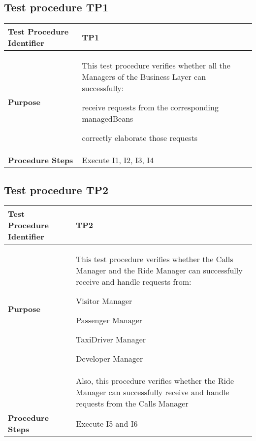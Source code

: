 \subsection{Test procedure TP1}

\begin{table}[!htbp]
\begin{center}
\begin{tabular}[t]{p{}|p{}}

\hline
\textbf{Test Procedure Identifier} & TP1 \\
\hline
\textbf{Purpose} & This test procedure verifies whether all the Managers of the Business Layer can successfully:
\begin{itemize*}
	\item receive requests from the corresponding managedBeans
	\item correctly elaborate those requests
\end{itemize*} \\
\hline
\textbf{Procedure Steps} & Execute I1, I2, I3, I4 \\
\hline

\end{tabular}
\end{center}
\end{table}


\subsection{Test procedure TP2}

\begin{table}[!htbp]
\begin{center}
\begin{tabular}[t]{p{}|p{}}

\hline
\textbf{Test Procedure Identifier} & TP2 \\
\hline
\textbf{Purpose} & This test procedure verifies whether the Calls Manager and the Ride Manager can successfully receive and handle requests from:
\begin{itemize*}
	\item Visitor Manager
	\item Passenger Manager
	\item TaxiDriver Manager
	\item Developer Manager
\end{itemize*} \\
 & Also, this procedure verifies whether the Ride Manager can successfully receive and handle requests from the Calls Manager \\
\hline
\textbf{Procedure Steps} & Execute I5 and I6 \\
\hline

\end{tabular}
\end{center}
\end{table}


